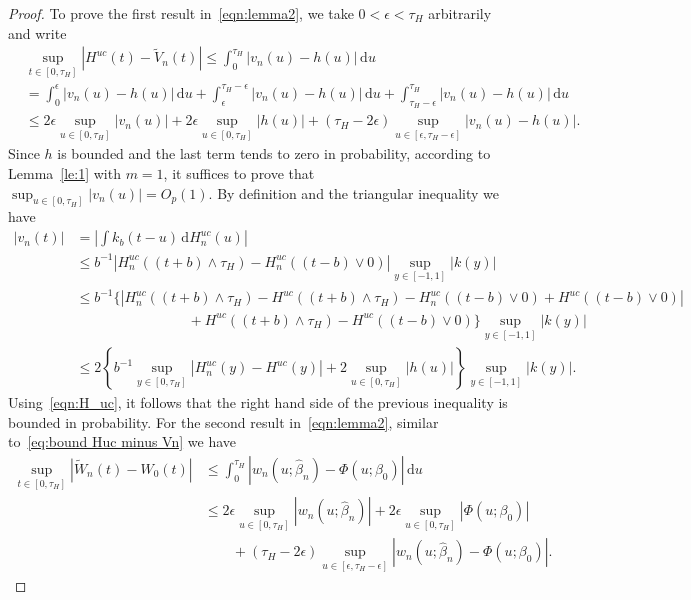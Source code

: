 \documentclass[11pt,reqno]{amsart}
\theoremstyle{definition}
\theoremstyle{plain}
\theoremstyle{remark}
\begin{document}
\begin{proof}
To prove the first result in~\eqref{eqn:lemma2}, we take $0<\epsilon<\tau_H$ arbitrarily and write
\begin{equation}
\label{eq:bound Huc minus Vn}
\begin{split}
&\sup_{t\in[0,\tau_H]}|H^{uc}(t)-\tilde{V}_n(t)|
\leq
\int_0^{\tau_H} |v_n(u)-h(u)|\,\mathrm{d}u\\
&=\int_0^\epsilon |v_n(u)-h(u)|\,\mathrm{d}u+\int_\epsilon^{\tau_H-\epsilon} |v_n(u)-h(u)|\,\mathrm{d}u+\int_{\tau_H-\epsilon}^{\tau_H} |v_n(u)-h(u)|\,\mathrm{d}u\\
&\leq
2\epsilon\sup_{u\in[0,\tau_H]}|v_n(u)|
+
2\epsilon\sup_{u\in[0,\tau_H]}|h(u)|
+
(\tau_H-2\epsilon)\sup_{u\in[\epsilon,\tau_H-\epsilon]}|v_n(u)-h(u)|.
\end{split}
\end{equation}
Since $h$ is bounded and the last term tends to zero in probability, according to Lemma~\ref{le:1} with $m=1$,
it suffices to prove that $\sup_{u\in[0,\tau_H]}|v_n(u)|=O_p(1)$.
By definition and the triangular inequality we have
\[
\begin{split}
|v_n(t)|
&=
\left|
\int
k_b\left(t-u\right)\,\mathrm{d}H^{uc}_n(u)\right|\\
&\leq
b^{-1}\left|
H^{uc}_n((t+b)\wedge \tau_H)-H^{uc}_n((t-b)\vee 0)
\right|
\sup_{y\in[-1,1]}|k(y)|\\
&\leq
b^{-1}
\Bigg\{
\left|
H^{uc}_n((t+b)\wedge \tau_H)-H^{uc}((t+b)\wedge \tau_H)
-
H^{uc}_n((t-b)\vee 0)+H^{uc}((t-b)\vee 0)\right|\\
&\qquad\qquad\qquad\qquad+
H^{uc}((t+b)\wedge \tau_H)-H^{uc}((t-b)\vee 0)
\Bigg\}
\sup_{y\in[-1,1]}|k(y)|\\
&\leq
2
\left\{
b^{-1}
\sup_{y\in[0,\tau_H]}|H^{uc}_n(y)-H^{uc}(y)|
+
2
\sup_{u\in[0,\tau_H]}|h(u)|
\right\}
\sup_{y\in[-1,1]}|k(y)|.
\end{split}
\]
Using~\eqref{eqn:H_uc}, it follows that the right hand side of the previous inequality is bounded in probability.
For the second result in~\eqref{eqn:lemma2}, similar to~\eqref{eq:bound Huc minus Vn} we have
\[
\begin{split}
\sup_{t\in[0,\tau_H]}
\left|\tilde W_n(t)-W_0(t)
\right|
&\leq
\int_0^{\tau_H}
\left|w_n(u;\hat\beta_n)-\Phi(u;\beta_0)\right|
\,\mathrm{d}u\\
&\leq
2\epsilon\sup_{u\in[0,\tau_H]}|w_n(u;\hat\beta_n)|
+
2\epsilon\sup_{u\in[0,\tau_H]}|\Phi(u;\beta_0)|\\
&\qquad+
(\tau_H-2\epsilon)\sup_{u\in[\epsilon,\tau_H-\epsilon]}\left|w_n(u;\hat\beta_n)-\Phi(u;\beta_0)\right|.

\end{split}\]
\end{proof}
\end{document}
